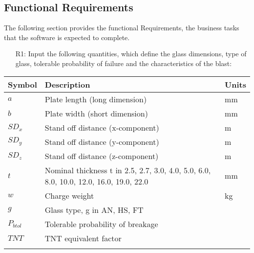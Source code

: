 \documentclass[12pt]{article}
\begin{document}
\subsection{Functional Requirements}
\label{Sec:FRs}
The following section provides the functional Requirements, the business tasks that the software is expected to complete.
\begin{itemize}
\item[R1:]Input the following quantities, which define the glass dimensions, type of glass, tolerable probability of failure and the characteristics of the blast:
\end{itemize}
\begin{longtable*}{l l l}
\toprule
Symbol & Description & Units
\\
\midrule
$a$ & Plate length (long dimension) & mm
\\
$b$ & Plate width (short dimension) & mm
\\
$SD_{x}$ & Stand off distance (x-component) & m
\\
$SD_{y}$ & Stand off distance (y-component) & m
\\
$SD_{z}$ & Stand off distance (z-component) & m
\\
$t$ & Nominal thickness t in {2.5, 2.7, 3.0, 4.0, 5.0, 6.0, 8.0, 10.0, 12.0, 16.0, 19.0, 22.0} & mm
\\
$w$ & Charge weight & kg
\\
$g$ & Glass type, g in {AN, HS, FT} & 
\\
$P_{btol}$ & Tolerable probability of breakage & 
\\
$TNT$ & TNT equivalent factor & 
\\
\bottomrule
\label{Table:ToS}
\end{longtable*}
\end{document}

